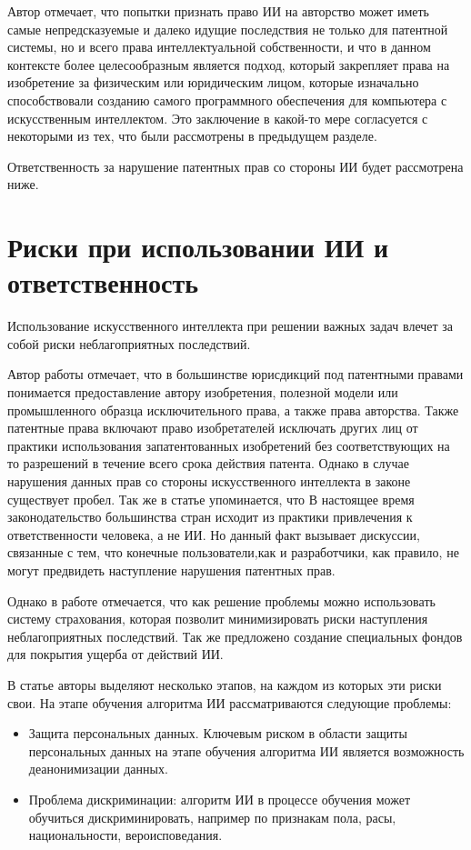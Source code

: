 Автор отмечает, что попытки признать право ИИ на авторство может иметь самые непредсказуемые
и далеко идущие последствия не только для патентной системы, но и всего права интеллектуальной
собственности,  и что в данном контексте более целесообразным является подход, который закрепляет
права на изобретение за физическим или юридическим лицом, которые изначально способствовали созданию
самого программного обеспечения для компьютера с искусственным интеллектом. Это заключение в какой-то мере
согласуется с некоторыми из тех, что были рассмотрены в предыдущем разделе.

Ответственность за нарушение патентных прав со стороны ИИ будет рассмотрена ниже.

\newpage

\section{Риски при использовании ИИ и ответственность}
Использование искусственного интеллекта при решении важных задач влечет за собой риски неблагоприятных
последствий.

Автор работы \cite{reg} отмечает, что в большинстве юрисдикций под патентными правами понимается
предоставление автору изобретения, полезной модели или промышленного образца исключительного права,
а также права авторства. Также патентные права включают право изобретателей исключать других лиц
от практики использования запатентованных изобретений без соответствующих на то разрешений в течение
всего срока действия патента. Однако в случае нарушения данных прав со стороны искусственного
интеллекта в законе существует пробел. Так же в статье \cite{reg} упоминается, что В настоящее время
законодательство большинства стран исходит из практики привлечения к ответственности человека, а не ИИ.
Но данный факт вызывает дискуссии, связанные с тем, что конечные пользователи,как и разработчики, как правило,
не могут предвидеть наступление нарушения патентных прав.

Однако в работе \cite{reg} отмечается, что как решение проблемы можно использовать систему страхования,
которая позволит минимизировать риски наступления неблагоприятных последствий. Так же предложено
создание специальных фондов для покрытия ущерба от действий ИИ.

В статье \cite{self} авторы выделяют несколько этапов, на каждом из которых эти риски свои.
На этапе обучения алгоритма ИИ рассматриваются следующие проблемы:

\begin{itemize}
\item Защита персональных данных. Ключевым риском в области защиты персональных данных на этапе обучения
алгоритма ИИ является возможность деанонимизации данных.
\item Проблема дискриминации: алгоритм ИИ в процессе обучения может обучиться дискриминировать, например
по признакам пола, расы, национальности, вероисповедания.
\end{itemize}

